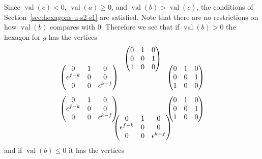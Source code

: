 \documentclass{amsart}
\theoremstyle{definition}
\def\e{\epsilon}
\def\val{\mathop{\mathrm{val}}}
\def\heximages#1#2#3#4#5#6{
  \heximagessqueezedcarefully{1.7em}{-1em}{#1}{#2}{#3}{#4}{#5}{#6}
}
\def\heximagessqueezedcarefully#1#2#3#4#5#6#7#8{
  \begin{array}{ccc}
    & #3 & \\[#2]
    #5 \hspace{-#1} & & \hspace{-#1} #4 \\[2em]
    #6 \hspace{-#1} & & \hspace{-#1} #7 \\[#2]
    & #8 &
  \end{array}
}
\begin{document}
  Since $\val(c) < 0$, $\val(a) \ge 0$, and $\val(b) > \val(c)$, the conditions
  of Section~\ref{sec:hexagons-u-s2-s1} are satisfied.  Note that there are no
  restrictions on how $\val(b)$ compares with $0$.  Therefore we see that if
  $\val(b) > 0$ the hexagon for $g$ has the vertices
  \begin{equation}
    \label{eq:2-d-max-f-min-s1-hex1}
    \heximages
	{\begin{pmatrix}
            0 & 1 & 0 \\
            0 & 0 & 1 \\
            1 & 0 & 0
	\end{pmatrix}}
	{\begin{pmatrix}
            0 & 1 & 0 \\
            0 & 0 & 1 \\
            1 & 0 & 0
	\end{pmatrix}}
	{\begin{pmatrix}
            0 & 1 & 0 \\
            \e^{f-k} & 0 & 0  \\
            0 & 0 & \e^{k-f}
	\end{pmatrix}}
	{\begin{pmatrix}
            0 & 1 & 0 \\
            \e^{f-k} & 0 & 0  \\
            0 & 0 & \e^{k-f}
	\end{pmatrix}}
	{\begin{pmatrix}
            0 & 1 & 0 \\
            0 & 0 & 1 \\
            1 & 0 & 0
	\end{pmatrix}}
	{\begin{pmatrix}
            0 & 1 & 0 \\
            \e^{f-k} & 0 & 0  \\
            0 & 0 & \e^{k-f}
	\end{pmatrix}}
  \end{equation}
  and if $\val(b) \le 0$ it has the vertices
\end{document}
